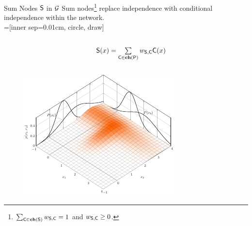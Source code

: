 \begin{frame}{Sum Nodes $\mathsf{S}$ in $\mathcal{G}$}
    Sum nodes\footnote{\scriptsize $\sum_{\mathsf{C} \in \mathbf{ch}(\mathsf{S})} w_{\mathsf{S},\mathsf{C}} = 1$ and $w_{\mathsf{S}, \mathsf{C}} \geq 0$.} replace independence with conditional independence within the network.\\[1em]

=[inner sep=0.01cm, circle, draw]
\begin{columns}
\begin{column}{.2\linewidth}
\end{column}
\begin{column}{.2\linewidth}
\end{column}
\begin{column}{.4\linewidth}
$\mathsf{S}(x)  = \sum\limits_{\mathsf{C} \in \mathbf{ch}(\mathsf{P})}  w_{\mathsf{S}, \mathsf{C}}\mathsf{C}(x)$
\end{column}
\begin{column}{.2\linewidth}
\end{column}
\end{columns}

\centering
\begin{figure}
\includegraphics{sum_distribution}
\end{figure}
\end{frame}

